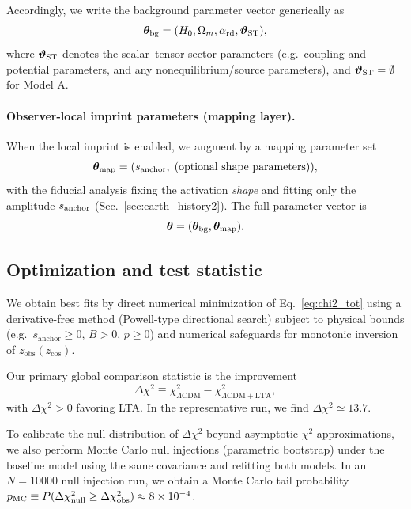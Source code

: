 \documentclass[10pt]{article}
\newcommand{\zobs}{z_{\mathrm{obs}}}
\newcommand{\zcos}{z_{\mathrm{cos}}}
\newcommand{\dchi}{\Delta\chi^2}
\begin{document}
Accordingly, we write the background parameter vector generically as
\begin{equation}
\bm{\theta}_{\rm bg} = (H_0,\Omega_m,\alpha_{\mathrm{rd}},\bm{\vartheta}_{\rm ST}),
\end{equation}
where \(\bm{\vartheta}_{\rm ST}\) denotes the scalar--tensor sector parameters (e.g.\ coupling and
potential parameters, and any nonequilibrium/source parameters), and \(\bm{\vartheta}_{\rm ST}=\emptyset\)
for Model A.

\paragraph{Observer-local imprint parameters (mapping layer).}
When the local imprint is enabled, we augment by a mapping parameter set
\begin{equation}
\bm{\theta}_{\rm map} = (s_{\mathrm{anchor}},\; \text{(optional shape parameters)}),
\end{equation}
with the fiducial analysis fixing the activation \emph{shape} and fitting only the amplitude
\(s_{\rm anchor}\) (Sec.~\ref{sec:earth_history2}).
The full parameter vector is
\begin{equation}
\bm{\theta} = (\bm{\theta}_{\rm bg},\bm{\theta}_{\rm map}).
\end{equation}

\subsection{Optimization and test statistic}
\label{sec:opt_stat}

We obtain best fits by direct numerical minimization of Eq.~\eqref{eq:chi2_tot} using a derivative-free method (Powell-type directional search) subject to physical bounds (e.g.\ $s_{\mathrm{anchor}}\ge 0$, $B>0$, $p\ge 0$) and numerical safeguards for monotonic inversion of $\zobs(\zcos)$.

Our primary global comparison statistic is the improvement
\begin{equation}
\dchi \equiv \chi^2_{\Lambda\mathrm{CDM}} - \chi^2_{\Lambda\mathrm{CDM+LTA}},
\label{eq:dchi_def2}
\end{equation}
with $\dchi>0$ favoring LTA. In the representative run, we find $\dchi \simeq 13.7$.

To calibrate the null distribution of $\dchi$ beyond asymptotic $\chi^2$ approximations, we also perform Monte Carlo null injections (parametric bootstrap) under the baseline model using the same covariance and refitting both models. In an $N=10000$ null injection run, we obtain a Monte Carlo tail probability
$p_{\rm MC}\equiv P(\Delta\chi^2_{\rm null}\ge \Delta\chi^2_{\rm obs}) \approx 8\times 10^{-4}$.
\end{document}
